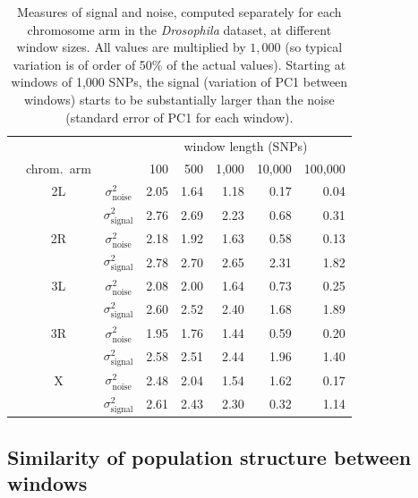 \documentclass[11pt, oneside]{article}   	%
\begin{document}
\begin{table}[ht]
\centering
    \begin{tabular}{cccrrrrr}
  \hline
        & & & \multicolumn{5}{c}{window length (SNPs)} \\
 & chrom.\ arm  & & 100 & 500 & 1,000 & 10,000 & 100,000 \\ 
  \hline
    & 2L & $\sigma^2_\text{noise}$  & 2.05  &  1.64  &  1.18  &  0.17  &  0.04 \\
    & 	 & $\sigma^2_\text{signal}$ & 2.76  &  2.69  &  2.23  &  0.68  &  0.31 \\
    & 2R & $\sigma^2_\text{noise}$  & 2.18  &  1.92  &  1.63  &  0.58  &  0.13 \\
    & 	 & $\sigma^2_\text{signal}$ & 2.78  &  2.70  &  2.65  &  2.31  &  1.82 \\
    & 3L & $\sigma^2_\text{noise}$  & 2.08  &  2.00  &  1.64  &  0.73  &  0.25 \\
    & 	 & $\sigma^2_\text{signal}$ & 2.60  &  2.52  &  2.40  &  1.68  &  1.89 \\
    & 3R & $\sigma^2_\text{noise}$  & 1.95  &  1.76  &  1.44  &  0.59  &  0.20 \\
    & 	 & $\sigma^2_\text{signal}$ & 2.58  &  2.51  &  2.44  &  1.96  &  1.40 \\
    & X  & $\sigma^2_\text{noise}$  & 2.48  &  2.04  &  1.54  &  1.62  &  0.17 \\
    & 	 & $\sigma^2_\text{signal}$ & 2.61  &  2.43  &  2.30  &  0.32  &  1.14 \\
   \hline
\end{tabular}
\caption{
    Measures of signal and noise,
    computed separately for each chromosome arm in the \textit{Drosophila} dataset,
    at different window sizes.
    All values are multiplied by $1,000$
    (so typical variation is of order of 50\% of the actual values).
    Starting at windows of 1,000 SNPs, the signal (variation of PC1 between windows)
    starts to be substantially larger than the noise (standard error of PC1 for each window).
} \label{tab:window_sizes}
\end{table}



\subsection{Similarity of population structure between windows}
\end{document}
